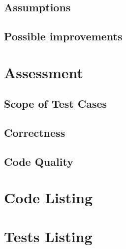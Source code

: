 \documentclass[12pt,a4paper]{article}
\begin{document}
\subsection{Assumptions}

\subsection{Possible improvements}

\section{Assessment}

\subsection{Scope of Test Cases}

\subsection{Correctness}

\subsection{Code Quality}

\appendix
\section{Code Listing}

\section{Tests Listing}
\end{document}
